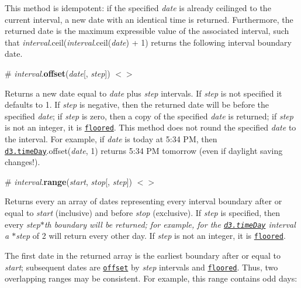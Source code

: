 This method is idempotent\+: if the specified {\itshape date} is already ceilinged to the current interval, a new date with an identical time is returned. Furthermore, the returned date is the maximum expressible value of the associated interval, such that {\itshape interval}.ceil({\itshape interval}.ceil({\itshape date}) + 1) returns the following interval boundary date.

\label{_interval_offset}%
\# {\itshape interval}.{\bfseries offset}({\itshape date}\mbox{[}, {\itshape step}\mbox{]}) \href{https://github.com/d3/d3-time/blob/master/src/interval.js#L22}{\tt $<$$>$}

Returns a new date equal to {\itshape date} plus {\itshape step} intervals. If {\itshape step} is not specified it defaults to 1. If {\itshape step} is negative, then the returned date will be before the specified {\itshape date}; if {\itshape step} is zero, then a copy of the specified {\itshape date} is returned; if {\itshape step} is not an integer, it is \href{https://developer.mozilla.org/en-US/docs/Web/JavaScript/Reference/Global_Objects/Math/floor}{\tt floored}. This method does not round the specified {\itshape date} to the interval. For example, if {\itshape date} is today at 5\+:34 PM, then \href{#timeDay}{\tt d3.\+time\+Day}.offset({\itshape date}, 1) returns 5\+:34 PM tomorrow (even if daylight saving changes!).

\label{_interval_range}%
\# {\itshape interval}.{\bfseries range}({\itshape start}, {\itshape stop}\mbox{[}, {\itshape step}\mbox{]}) \href{https://github.com/d3/d3-time/blob/master/src/interval.js#L26}{\tt $<$$>$}

Returns every an array of dates representing every interval boundary after or equal to {\itshape start} (inclusive) and before {\itshape stop} (exclusive). If {\itshape step} is specified, then every {\itshape step$\ast$th boundary will be returned; for example, for the \href{#timeDay}{\tt d3.\+time\+Day} interval a $\ast$step} of 2 will return every other day. If {\itshape step} is not an integer, it is \href{https://developer.mozilla.org/en-US/docs/Web/JavaScript/Reference/Global_Objects/Math/floor}{\tt floored}.

The first date in the returned array is the earliest boundary after or equal to {\itshape start}; subsequent dates are \href{#interval_offset}{\tt offset} by {\itshape step} intervals and \href{#interval_floor}{\tt floored}. Thus, two overlapping ranges may be consistent. For example, this range contains odd days\+:


